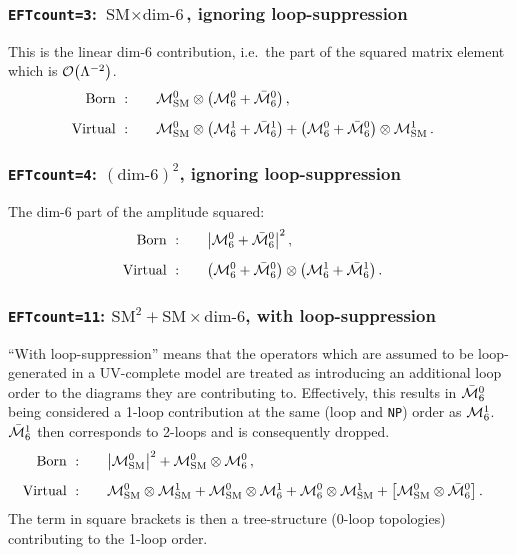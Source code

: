 \subsubsection*{\boldmath\texttt{EFTcount=3}: $\text{SM}\times\text{dim-6}$, ignoring loop-suppression}
This is the linear dim-6 contribution, i.e.\ the part of the squared matrix element which is $\order{\Lambda^{-2}}$.
\begin{align}
    \text{Born }: &\qquad \mathcal{M}_\mathrm{SM}^0\otimes\qty(\mathcal{M}_6^0+\bar{\mathcal{M}}_6^0)\,,&\\[5pt]
    \text{Virtual }: &\qquad \mathcal{M}_\mathrm{SM}^0\otimes\qty(\mathcal{M}_6^1+\bar{\mathcal{M}}_6^1) + \qty(\mathcal{M}_6^0+\bar{\mathcal{M}}_6^0)\otimes\mathcal{M}_\mathrm{SM}^1\,.&
\end{align}

\subsubsection*{\boldmath\texttt{EFTcount=4}: $(\text{dim-6})^2$, ignoring loop-suppression}
The dim-6 part of the amplitude squared:
\begin{align}
    \text{Born }: &\qquad \abs{\mathcal{M}_6^0+\bar{\mathcal{M}}_6^0}^2\,,&\\[5pt]
    \text{Virtual }: &\qquad \qty(\mathcal{M}_6^0+\bar{\mathcal{M}}_6^0)\otimes\qty(\mathcal{M}_6^1+\bar{\mathcal{M}}_6^1)\,.&
\end{align}

\subsubsection*{\boldmath\texttt{EFTcount=11}: $\text{SM}^2+\text{SM}\times\text{dim-6}$, with loop-suppression}
``With loop-suppression'' means that the operators which are assumed to be loop-generated in a UV-complete model are treated as introducing an additional loop order to the diagrams they are contributing to. Effectively, this results in $\bar{\mathcal{M}}_6^0$ being considered a 1-loop contribution at the same (loop and \texttt{NP}) order as $\mathcal{M}_6^1$. $\bar{\mathcal{M}}_6^1$ then corresponds to 2-loops and is consequently dropped.
\begin{align}
    \text{Born }: &\qquad \abs{\mathcal{M}_\mathrm{SM}^0}^2 + \mathcal{M}_\mathrm{SM}^0\otimes\mathcal{M}_6^0\,,&\\[5pt]
    \text{Virtual }: &\qquad \mathcal{M}_\mathrm{SM}^0\otimes\mathcal{M}_\mathrm{SM}^1 + \mathcal{M}_\mathrm{SM}^0\otimes\mathcal{M}_6^1 + \mathcal{M}_6^0\otimes\mathcal{M}_\mathrm{SM}^1 + \qty[\mathcal{M}_\mathrm{SM}^0\otimes\bar{\mathcal{M}}_6^0]\,.&
\end{align}
The term in square brackets is then a tree-structure (0-loop topologies) contributing to the 1-loop order.

